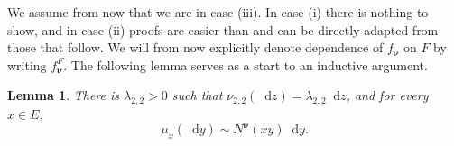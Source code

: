 \documentclass[reqno,draft]{amsart}
\numberwithin{equation}{section}
\theoremstyle{plain}
\newtheorem{lemma}[theorem]{Lemma}
\theoremstyle{remark}
\newcommand*\diff{\mathop{}\!\mathrm{d}}
\newcommand{\e}{\mathrm{e}}
\newcommand{\fnu}{f_{\boldsymbol \nu}}
\begin{document}
We assume from now that we are in case (iii). In case (i) there is nothing to show, and in case (ii) proofs are easier than and can be directly adapted from those that follow. We will from now explicitly denote dependence of $\fnu$ on $F$ by writing $\fnu^F$. The following lemma serves as a start to an inductive argument.


\begin{lemma}\label{lem:nu1}
    There is $\lambda_{2,2} > 0$ such that $\nu_{2,2}(\diff z) = \lambda_{2,2}\diff z$, and for every $x\in E$, \[
        \mu_x(\diff y) \sim N^{\boldsymbol \nu}(xy) \diff y.
    \]
\end{lemma}
\end{document}
